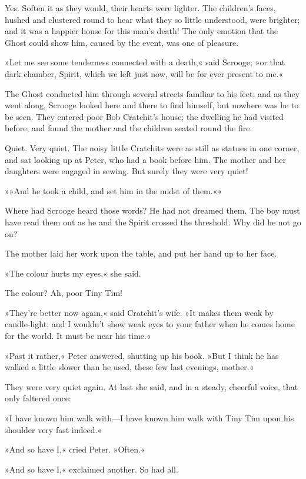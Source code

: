 Yes. Soften it as they would, their hearts were lighter. The children's faces, hushed and clustered round to hear what they so little understood, were brighter; and it was a happier house for this man's death! The only emotion that the Ghost could show him, caused by the event, was one of pleasure.

»Let me see some tenderness connected with a death,« said Scrooge; »or that dark chamber, Spirit, which we left just now, will be for ever present to me.«

The Ghost conducted him through several streets familiar to his feet; and as they went along, Scrooge looked here and there to find himself, but nowhere was he to be seen. They entered poor Bob Cratchit's house; the dwelling he had visited before; and found the mother and the children seated round the fire.

Quiet. Very quiet. The noisy little Cratchits were as still as statues in one corner, and sat looking up at Peter, who had a book before him. The mother and her daughters were engaged in sewing. But surely they were very quiet!

»»And he took a child, and set him in the midst of them.««

Where had Scrooge heard those words? He had not dreamed them. The boy must have read them out as he and the Spirit crossed the threshold. Why did he not go on?

The mother laid her work upon the table, and put her hand up to her face.

»The colour hurts my eyes,« she said.

The colour? Ah, poor Tiny Tim!

»They're better now again,« said Cratchit's wife. »It makes them weak by candle-light; and I wouldn't show weak eyes to your father when he comes home for the world. It must be near his time.«

»Past it rather,« Peter answered, shutting up his book. »But I think he has walked a little slower than he used, these few last evenings, mother.«

They were very quiet again. At last she said, and in a steady, cheerful voice, that only faltered once:

»I have known him walk with---I have known him walk with Tiny Tim upon his shoulder very fast indeed.«

»And so have I,« cried Peter. »Often.«

»And so have I,« exclaimed another. So had all.

